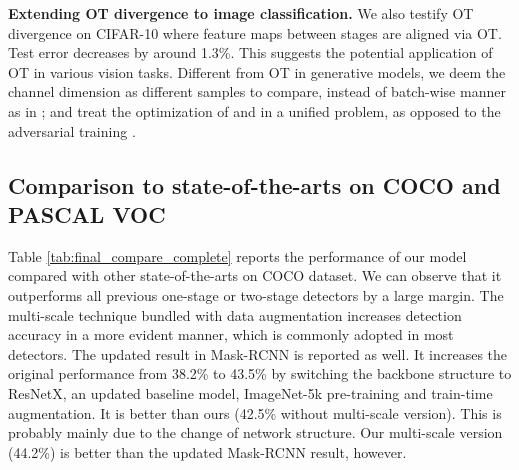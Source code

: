 \documentclass{article} \usepackage{iclr2019_conference,times}
\begin{document}
\textbf{Extending OT divergence to image classification.} We also testify OT divergence on CIFAR-10 \citep{cifar} where feature maps between stages 
are aligned via OT. 
Test error decreases by around 1.3\%. This suggests the potential application of OT in various vision tasks.
Different from OT in generative models, we deem the channel dimension as different samples to compare, instead of batch-wise manner as in \citep{salimans2018improving}; and treat the optimization of  and  in a unified  problem, as opposed to the adversarial training \citep{genevay2017_sinkhorn_loss}.









\subsection{Comparison to state-of-the-arts on COCO and PASCAL VOC}

Table \ref{tab:final_compare_complete} reports the performance of our model compared with other state-of-the-arts on COCO dataset. We can observe that it outperforms all previous one-stage or two-stage detectors by a large margin. 
The multi-scale technique bundled with data augmentation increases detection accuracy 
in a more evident manner, which is commonly adopted in most detectors. 
{
The updated result in Mask-RCNN is reported as well. It increases the original performance from 38.2\% to 43.5\%
by switching the backbone structure to ResNetX, an updated baseline model, ImageNet-5k pre-training and train-time augmentation. It is better than ours (42.5\% without multi-scale version). This is probably mainly due to the change of network structure. Our multi-scale version (44.2\%) is better than the updated Mask-RCNN result, however.}
\end{document}
